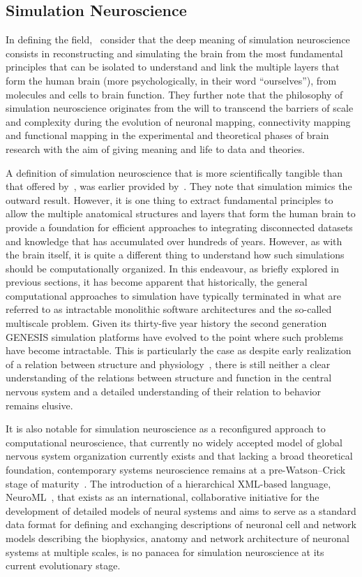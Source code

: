 \documentclass[11pt,3p,twocolumn]{JMN}
\begin{document}
\subsection{Simulation Neuroscience}
\label{subsection:simneuro}

In defining the field,~\citet{fan19} consider that the deep meaning of simulation neuroscience consists in reconstructing and simulating the brain from the most fundamental principles that can be isolated to understand and link the multiple layers that form the human brain (more psychologically, in their word ``ourselves''), from molecules and cells to brain function. They further note that the philosophy of simulation neuroscience originates from the will to transcend the barriers of scale and complexity during the evolution of neuronal mapping, connectivity mapping and functional mapping in the experimental and theoretical phases of brain research with the aim of giving meaning and life to data and theories.

A definition of simulation neuroscience that is more scientifically tangible than that offered by~\citet{fan19}, was earlier provided by~\citet{sandberg08}. They note that simulation mimics the outward result. However, it is one thing to extract fundamental principles to allow the multiple anatomical structures and layers that form the human brain to provide a foundation for efficient approaches to integrating disconnected datasets and knowledge that has accumulated over hundreds of years. However, as with the brain itself, it is quite a different thing to understand how such simulations should be computationally organized. In this endeavour, as briefly explored in previous sections, it has become apparent that historically, the general computational approaches to simulation have typically terminated in what are referred to as intractable monolithic software architectures and the so-called multiscale problem. Given its thirty-five year history the second generation GENESIS simulation platforms have evolved to the point where such problems have become intractable. This is particularly the case as despite early realization of a relation between structure and physiology~\citep[see, for example][]{sieck17}, there is still neither a clear understanding of the relations between structure and function in the central nervous system and a detailed understanding of their relation to behavior remains elusive.

It is also notable for simulation neuroscience as a reconfigured approach to computational neuroscience, that currently no widely accepted model of global nervous system organization currently exists and that lacking a broad theoretical foundation, contemporary systems neuroscience remains at a pre-Watson–Crick stage of maturity~\citep{swanson10}. The introduction of a hierarchical XML-based language, NeuroML~\citep{gleeson10:neuroml}, that exists as an international, collaborative initiative for the development of detailed models of neural systems and aims to serve as a standard data format for defining and exchanging descriptions of neuronal cell and network models describing the biophysics, anatomy and network architecture of neuronal systems at multiple scales, is no panacea for simulation neuroscience at its current evolutionary stage.
\end{document}
